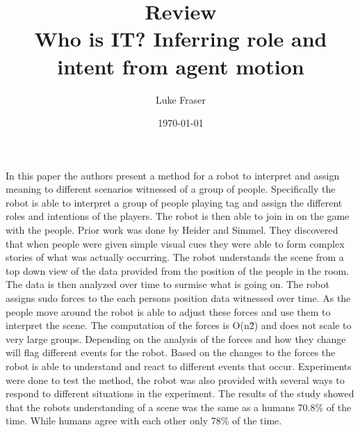 \documentclass{article}
\begin{document}
\title{{\large Review} \\ Who is IT? Inferring role and intent from agent motion}
\author{Luke Fraser}
\date{\today}
\maketitle

\begingroup
\renewcommand{\section}[2]{}


\endgroup

\section*{Summary}
In this paper the authors present a method for a robot to interpret and assign meaning to different scenarios witnessed of a group of people. Specifically the robot is able to interpret a group of people playing tag and assign the different roles and intentions of the players. The robot is then able to join in on the game with the people. Prior work was done by Heider and Simmel. They discovered that when people were given simple visual cues they were able to form complex stories of what was actually occurring. The robot understands the scene from a top down view of the data provided from the position of the people in the room. The data is then analyzed over time to surmise what is going on. The robot assigns sudo forces to the each persons position data witnessed over time. As the people move around the robot is able to adjust these forces and use them to interpret the scene. The computation of the forces is O(n\^2) and does not scale to very large groups. Depending on the analysis of the forces and how they change will flag different events for the robot. Based on the changes to the forces the robot is able to understand and react to different events that occur. Experiments were done to test the method, the robot was also provided with several ways to respond to different situations in the experiment. The results of the study showed that the robots understanding of a scene was the same as a humans 70.8\% of the time. While humans agree with each other only 78\% of the time.
\end{document}
